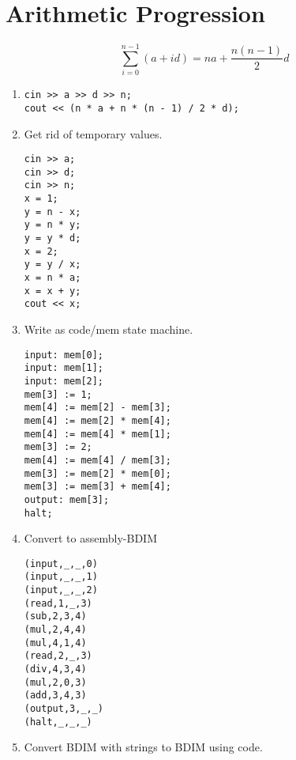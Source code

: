 \documentclass{scrartcl}
\begin{document}
\section{Arithmetic Progression}
\[\sum_{i = 0}^{n - 1} (a + id) = na + \frac{n(n - 1)}{2} d\]
\begin{enumerate}
\item \begin{verbatim}
cin >> a >> d >> n;
cout << (n * a + n * (n - 1) / 2 * d);
\end{verbatim}

\item Get rid of temporary values.

\begin{verbatim}
cin >> a;
cin >> d;
cin >> n;
x = 1;
y = n - x;
y = n * y;
y = y * d;
x = 2;
y = y / x;
x = n * a;
x = x + y;
cout << x;
\end{verbatim}

\item Write as code/mem state machine.
\begin{verbatim}
input: mem[0];
input: mem[1];
input: mem[2];
mem[3] := 1;
mem[4] := mem[2] - mem[3];
mem[4] := mem[2] * mem[4];
mem[4] := mem[4] * mem[1];
mem[3] := 2;
mem[4] := mem[4] / mem[3];
mem[3] := mem[2] * mem[0];
mem[3] := mem[3] + mem[4];
output: mem[3];
halt;
\end{verbatim}

\item Convert to assembly-BDIM
\begin{verbatim}
(input,_,_,0)
(input,_,_,1)
(input,_,_,2)
(read,1,_,3)
(sub,2,3,4)
(mul,2,4,4)
(mul,4,1,4)
(read,2,_,3)
(div,4,3,4)
(mul,2,0,3)
(add,3,4,3)
(output,3,_,_)
(halt,_,_,_)
\end{verbatim}

\item Convert BDIM with strings to BDIM using code.
	\inputminted[linenos,firstnumber=0]{text}{bdim/ap.bdim}
\end{enumerate}
\end{document}
